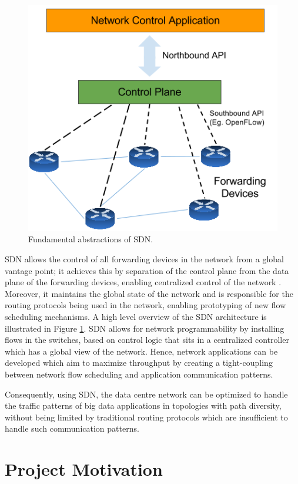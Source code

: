 \begin{figure}[!ht]
\centerline{\includegraphics[scale=0.50]{SDNOverview.png}}
\caption{Fundamental abstractions of SDN.}
\label{Sec:SDNOverview}
\end{figure}

SDN allows the control of all forwarding devices in the network from a global vantage point; it achieves this by separation of the control plane from the data plane of the forwarding devices, enabling centralized control of the network \cite{mckeown2011sdn}. Moreover, it maintains the global state of the network and is responsible for the routing protocols being used in the network, enabling prototyping of new flow scheduling mechanisms. A high level overview of the SDN architecture is illustrated in Figure \ref{Sec:SDNOverview}. SDN allows for network programmability by installing flows in the switches, based on control logic that sits in a centralized controller which has a global view of the network. Hence, network applications can be developed which aim to maximize throughput by creating a tight-coupling between network flow scheduling and application communication patterns.  

Consequently, using SDN, the data centre network can be optimized to handle the traffic patterns of big data applications in topologies with path diversity, without being limited by traditional routing protocols which are insufficient to handle such communication patterns. 

\section{Project Motivation}

